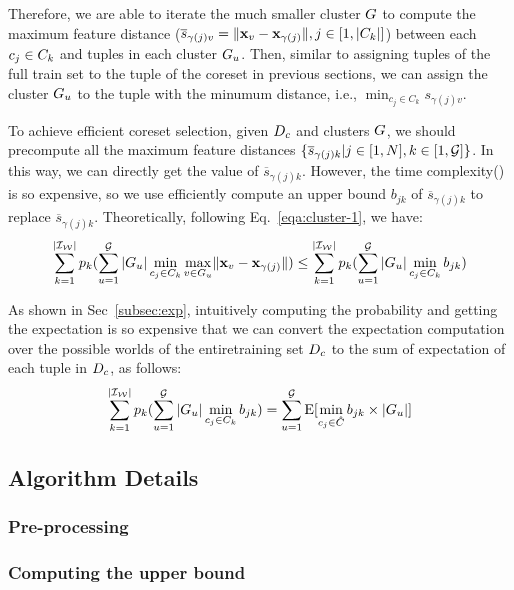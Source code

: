 Therefore,  we are able to iterate the much smaller cluster $G$ to compute  the maximum feature distance (\ie $\overline{s}_{\gamma(j)v} = \Vert\mathbf{x}_v - \mathbf{x}_{\gamma(j)} \Vert, j \in [1,|C_k|]$) between each $c_j \in C_k$ and tuples in each cluster $G_u$. Then, similar to assigning tuples of the full train set to the tuple of the coreset in previous sections, we can assign the cluster $G_u$ to the tuple  with the minumum distance, i.e., $\min_{c_j\in C_k} s_{\gamma(j)v}$.
 
To achieve efficient coreset selection, given $D_c$ and clusters $G$, we should precompute all the maximum feature distances $\{\overline{s}_{\gamma(j)k}|j \in [1,N], k \in [1,\mathcal{G}]\}$. In this way, we can directly get the value of $\overline{s}_{\gamma(j)k}$. However, the time complexity() is so expensive, so we use efficiently compute an upper bound $b_{jk}$ of  $\overline{s}_{\gamma(j)k}$ to replace $\overline{s}_{\gamma(j)k}$. Theoretically, following Eq.~\ref{eqa:cluster-1}, we have:
\vspace{-0.5em}
\begin{equation}\label{eqa:cluster-3}
    \begin{aligned}
    \sum_{k= 1}^{|\mathcal{I_W}|} p_k (\sum_{u=1}^{\mathcal{G}} |G_u| \min_{c_j\in C_k} \max_{v \in G_u} \lVert\mathbf{x}_v - \mathbf{x}_{\gamma(j)}\rVert) \leq \sum_{k= 1}^{|\mathcal{I_W}|} p_k (\sum_{u=1}^{\mathcal{G}} |G_u| \min_{c_j\in C_k} b_{jk})
    \end{aligned}
\end{equation}

As shown in Sec~\ref{subsec:exp}, intuitively computing the probability and getting the expectation is so expensive that we can convert the expectation computation over the possible worlds of the entiretraining set $D_c$ to the sum of expectation of each tuple in $D_c$, as follows:
\vspace{-0.5em}
\begin{equation}\label{eqa:cluster-4}
    \begin{aligned}
    \sum_{k= 1}^{|\mathcal{I_W}|} p_k (\sum_{u=1}^{\mathcal{G}} |G_u| \min_{c_j\in C_k} b_{jk}) = \sum_{u=1}^{\mathcal{G}} \mathrm{E}[\min_{c_j\in \hat{C}}b_{jk} \times |G_u|]
    \end{aligned}
\end{equation}

\subsection{Algorithm Details}


\subsubsection{Pre-processing}


\subsubsection{Computing the upper bound}



